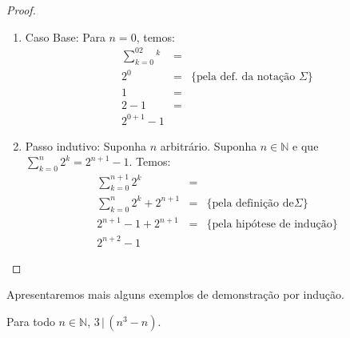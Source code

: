 \begin{proof}
\verb| |\\
\begin{enumerate}
  \item[\ ]Caso Base: Para $n = 0$, temos:
\[
\begin{array}{lcl}
\sum_{k = 0}^02^k & = \\
2^0                       & = & \{\text{pela def. da notação }\Sigma\}\\
1                          & = &\\
2 - 1                    & = & \\
2^{0 + 1} - 1
\end{array}
\]
  \item[\ ]Passo indutivo: Suponha $n$ arbitrário. Suponha $n
    \in\mathbb{N}$ e que $\sum_{k = 0}^n 2^k = 2^{n + 1} - 1$. Temos:
\[
\begin{array}{lcl}
\sum_{k = 0}^{n + 1}2^k & = & \\
\sum_{k = 0}^{n}2^k + 2^{n + 1} & = &\{\text{pela definição de
}\Sigma\}\\
2^{n + 1} - 1 + 2^{n+1} & = &\{\text{pela hipótese de indução}\}\\
2^{n+2} -1
\end{array}
\]
\end{enumerate}
\end{proof}
Apresentaremos mais alguns exemplos de demonstração por indução.
\begin{Theorem}
Para todo $n\in\mathbb{N}$, $3\,|\,(n^3 - n)$.
\end{Theorem}
